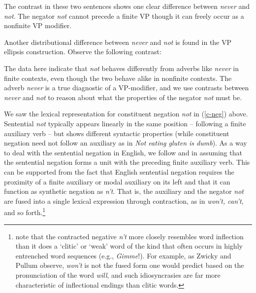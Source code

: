 \documentclass[output=paper]{langsci/langscibook}
\begin{document}
\be
\ex \begin{xlist}
\end{xlist}
\ee
%
The contrast in these two sentences
shows one clear difference between \emph{never}
and \emph{not}. The negator \emph{not} cannot
precede a finite VP though it can freely occur
as a nonfinite VP modifier.
%
%
%
%

Another distributional difference between \emph{never} and \emph{not} is found in
the VP ellipsis construction.  Observe the following
contrast:

\be
\ex \begin{xlist}
\label{vpe-not-ex}
\end{xlist}
\ee


%
The data here indicate that \emph{not} behaves differently from
adverbs like \emph{never} in finite contexts, even though the two
behave alike in nonfinite contexts. The adverb \emph{never} is a true
diagnostic of a VP-modifier, and we use contrasts between {\it
never} and \emph{not} to reason about what the properties of
the negator \emph{not} must be.


We saw the lexical representation for constituent negation
\emph{not} in (\ref{c-neg}) above.
 Sentential \emph{not}
typically appears linearly in the
same position -- following a finite auxiliary verb -- but shows
different syntactic properties (while
 constituent negation need not follow an auxiliary
 as in {\it Not eating gluten is dumb}).
 As a way
 to deal with the sentential negation in English,
  we follow \citet{Bresnan:01} and \citet{KM} in assuming that the sentential negation forms a unit with the preceding
finite auxiliary verb.  This can be supported from
the fact that English sentential negation requires the proximity of
a finite auxiliary or modal auxiliary on its left and that it can function as synthetic negation as {\it n't}. That is, the auxiliary and the negator {\it not} are fused into a single lexical
expression through contraction, as in {\it won't, can't},
and so forth.\footnote{\citet{ZP:83} note that the contracted
negative {\it n't} more closely
resembles word inflection than it does a `clitic' or `weak' word of
the kind that often occurs in highly entrenched word sequences
(e.g., {\it Gimme}!). For example, as Zwicky and Pullum observe,
{\it won't} is not the fused form one would predict based on
the pronunciation of the word {\it will}, and such idiosyncrasies are far more characteristic of inflectional endings than clitic words.}
\end{document}
